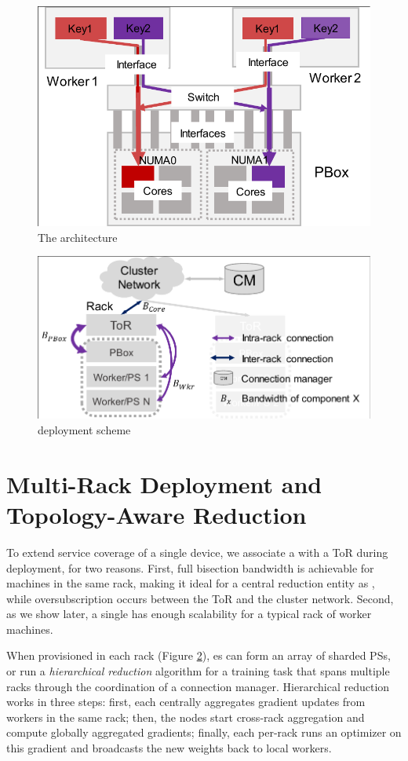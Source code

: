 \begin{figure}[t!]
	\centering
	\includegraphics[width=.6\linewidth,trim=2 1 1 1,clip]{Figures/PHubOverview.pdf}
	\caption{The \pbox architecture}
	\label{fig:phub}
\end{figure}



\begin{figure}[t!]
	\centering
	\includegraphics[width=.7\linewidth,trim=3 1 1 2,clip]{Figures/PBoxDeployment.pdf}
	\caption{\pbox deployment scheme}
	\label{fig:pBoxDeployment}
\end{figure}


\section{Multi-Rack Deployment and Topology-Aware Reduction}
\label{sec:hierarchicalReduction}
To extend service coverage of a single \pbox device, we associate a \pbox with a ToR during deployment, for two reasons. First, full bisection bandwidth is achievable for machines in the same rack, making it ideal for a central reduction entity as \pbox, while oversubscription occurs between the ToR and the cluster network. Second, as we show later, a single \pbox has enough scalability for a typical rack of worker machines.

When provisioned in each rack (Figure \ref{fig:pBoxDeployment}), \pbox{}es can form an array of sharded PSs, or run a \textit{hierarchical reduction} algorithm for a training task that spans multiple racks through the coordination of a connection manager. Hierarchical reduction works in three steps: first, each \pbox centrally aggregates gradient updates from workers in the same rack; then, the \pbox{} nodes start cross-rack aggregation and compute globally aggregated gradients; finally, each per-rack \pbox runs an optimizer on this gradient and broadcasts the new weights back to local workers.


